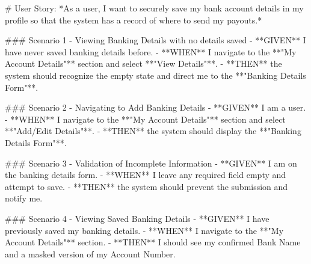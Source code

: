 # User Story: 
*As a user, I want to securely save my bank account details in my profile so that the system has a record of where to send my payouts.*

### Scenario 1 - Viewing Banking Details with no details saved
- **GIVEN** I have never saved banking details before.
- **WHEN** I navigate to the **"My Account Details"** section and select **"View Details"**.
- **THEN** the system should recognize the empty state and direct me to the **"Banking Details Form"**.

### Scenario 2 - Navigating to Add Banking Details
- **GIVEN** I am a user.
- **WHEN** I navigate to the **"My Account Details"** section and select **"Add/Edit Details"**.
- **THEN** the system should display the **"Banking Details Form"**.

### Scenario 3 - Validation of Incomplete Information
- **GIVEN** I am on the banking details form.
- **WHEN** I leave any required field empty and attempt to save.
- **THEN** the system should prevent the submission and notify me.

### Scenario 4 - Viewing Saved Banking Details
- **GIVEN** I have previously saved my banking details.
- **WHEN** I navigate to the **"My Account Details"** section.
- **THEN** I should see my confirmed Bank Name and a masked version of my Account Number.
